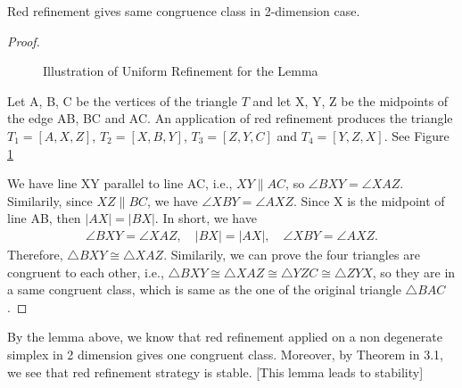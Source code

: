     \begin{lemma*}
    Red refinement gives same congruence class in 2-dimension case.
    \end{lemma*}
    \begin{proof}
    \begin{figure}
    \centering
    \caption{Illustration of Uniform Refinement for the Lemma}
    \label{Fig4}
    \end{figure}

    Let A, B, C be the vertices of the triangle $T$ and let X, Y, Z be the midpoints of the edge AB, BC and AC. An application of red refinement produces the triangle $T_1 = [A, X, Z]$, $T_2 = [X, B, Y]$, $T_3 = [Z, Y, C]$ and $T_4 = [Y, Z, X]$. See Figure \ref{Fig4}

    We have line XY parallel to line AC, i.e., $XY \parallel AC$, so $\angle{BXY} = \angle{XAZ}$. Similarily, since $XZ\parallel BC$, we have $\angle{XBY} = \angle{AXZ}$. Since X is the midpoint of line AB, then $|AX| = |BX|$. In short, we have 
    \begin{align*}
    \angle{BXY} = \angle{XAZ},
    \quad
    |BX| = |AX|,
    \quad
    \angle{XBY} = \angle{AXZ}.
    \end{align*}
    Therefore, $\triangle{BXY} \cong \triangle{XAZ}$. Similarily, we can prove the four triangles are congruent to each other, i.e., $\triangle{BXY}\cong\triangle{XAZ}\cong\triangle{YZC} \cong\triangle{ZYX}$, so they are in a same congruent class, which is same as the one of the original triangle $\triangle{BAC}$.
    \end{proof}
    By the lemma above, we know that red refinement applied on a non degenerate simplex in 2 dimension gives one congruent class. Moreover, by Theorem in 3.1, we see that red refinement strategy is stable.
    [This lemma leads to stability]


